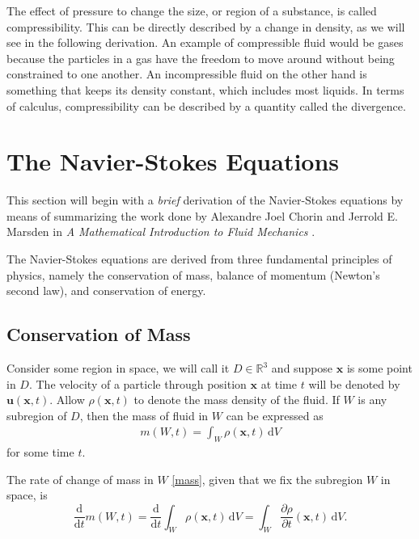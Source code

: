 \documentclass[undefended]{sfuthesis}
\begin{document}
The effect of pressure to change the size, or region of a substance, is called compressibility. This can be directly described by a change in density, as we will see in the following derivation. An example of compressible fluid would be gases because the particles in a gas have the freedom to move around without being constrained to one another. An incompressible fluid on the other hand is something that keeps its density constant, which includes most liquids. In terms of calculus, compressibility can be described by a quantity called the divergence.

\section{The Navier-Stokes Equations}
\label{sec:navierStokesEq}

This section will begin with a \textit{brief} derivation of the Navier-Stokes equations by means of summarizing the work done by Alexandre Joel Chorin and Jerrold E. Marsden in \textit{A Mathematical Introduction to Fluid Mechanics} \cite{mathematicalIntroFluids}. 

The Navier-Stokes equations are derived from three fundamental principles of physics, namely the conservation of mass, balance of momentum (Newton's second law), and conservation of energy.

\subsection{Conservation of Mass}

Consider some region in space, we will call it $D \in \mathbb{R}^3$ and suppose $\textbf{x}$ is some point in $D$. The velocity of a particle through position $\textbf{x}$ at time $t$ will be denoted by $\textbf{u}(\textbf{x}, t)$. Allow $\rho(\textbf{x}, t)$ to denote the mass density of the fluid. If $W$ is any subregion of $D$, then the mass of fluid in $W$ can be expressed as
\begin{align}
m(W, t) = \int_W \rho (\textbf{x}, t) \,\mathrm{d}V \label{mass}
\end{align}
for some time $t$.

The rate of change of mass in $W$ \eqref{mass}, given that we fix the subregion $W$ in space, is \[\frac{\mathrm{d}}{\mathrm{d} t} m (W, t) = \frac{\mathrm{d}}{\mathrm{d} t} \int_W \rho(\textbf{x}, t) \,\mathrm{d} V = \int_W \frac{\partial \rho}{\partial t}(\textbf{x}, t) \,\mathrm{d} V.\]
\end{document}
